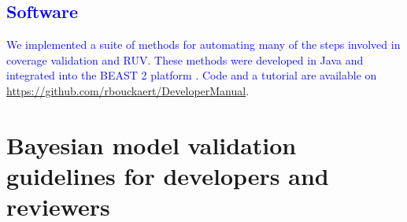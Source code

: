\documentclass[oneside]{article}
\begin{document}



\subsection*{\textcolor{blue}{Software}}

\textcolor{blue}{We implemented a suite of methods for automating many of the steps involved in coverage validation and RUV.
These methods were developed in Java and integrated into the BEAST 2 platform \citep{beast25}.
Code and a tutorial are available on \href{https://github.com/rbouckaert/DeveloperManual}{https://github.com/rbouckaert/DeveloperManual}.
}

\section*{Bayesian model validation guidelines for developers and reviewers}
\end{document}
